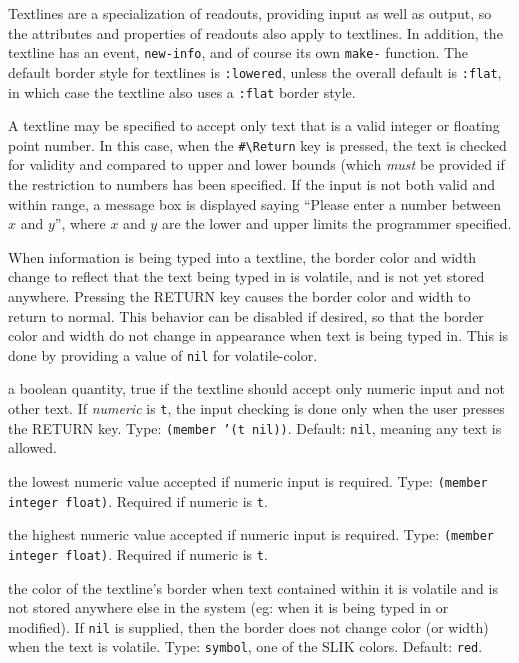 \documentclass[twoside,openright,11pt]{report}
\newcommand{\tp}[1]{\texttt{#1}}
\begin{document}
Textlines are a specialization of readouts, providing input as well as
output, so the attributes and properties of readouts also apply to
textlines.  In addition, the textline has an event, \tp{new-info}, and
of course its own \tp{make-} function.  The default border style for
textlines is \tp{:lowered}, unless the overall default is \tp{:flat},
in which case the textline also uses a \tp{:flat} border style.

A textline may be specified to accept only text that is a valid
integer or floating point number.  In this case, when the
\verb|#\Return| key is pressed, the text is checked for validity and
compared to upper and lower bounds (which \emph{must} be provided if
the restriction to numbers has been specified.  If the input is not
both valid and within range, a message box is displayed saying
``Please enter a number between $x$ and $y$'', where $x$ and $y$ are
the lower and upper limits the programmer specified.

When information is being typed into a textline, the border color and
width change to reflect that the text being typed in is volatile, and
is not yet stored anywhere.  Pressing the RETURN key causes the border
color and width to return to normal.  This behavior can be disabled if
desired, so that the border color and width do not change in
appearance when text is being typed in.  This is done by providing a
value of \tp{nil} for volatile-color.


{a boolean quantity, true if the textline should accept only numeric
input and not other text.  If \emph{numeric} is \tp{t}, the input
checking is done only when the user presses the RETURN key.  Type:
\tp{(member '(t nil))}.  Default: \tp{nil}, meaning any text
is allowed.}

{the lowest numeric value accepted if numeric input is required.
Type: \tp{(member integer float)}.  Required if numeric is
\tp{t}.}

{the highest numeric value accepted if numeric input is required.
Type: \tp{(member integer float)}.  Required if numeric is
\tp{t}.}

{the color of the textline's border when text contained within it is
volatile and is not stored anywhere else in the system (eg: when it is
being typed in or modified).  If \tp{nil} is supplied, then the
border does not change color (or width) when the text is volatile.
Type: \tp{symbol}, one of the SLIK colors. Default: \tp{red}.}
\end{document}
